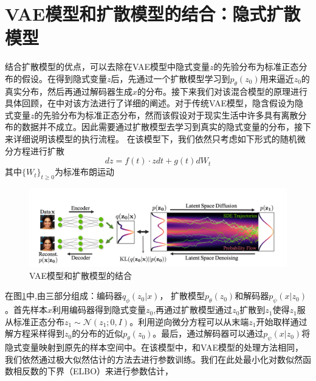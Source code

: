 \section{VAE模型和扩散模型的结合：隐式扩散模型}
结合扩散模型的优点，可以去除在VAE模型中隐式变量$z$的先验分布为标准正态分布的假设。在得到隐式变量$z$后，先通过一个扩散模型学习到$p_{\theta}(z_0)$用来逼近$z_0$的真实分布，然后再通过解码器生成$x$的分布。接下来我们对该混合模型的原理进行具体回顾，在\cite{VAE_diffusion}中对该方法进行了详细的阐述。对于传统VAE模型，隐含假设为隐式变量$z$的先验分布为标准正态分布，然而该假设对于现实生活中许多具有离散分布的数据并不成立。因此需要通过扩散模型去学习到真实的隐式变量的分布，接下来详细说明该模型的执行流程。
在该模型下，我们依然只考虑如下形式的随机微分方程进行扩散
\begin{equation}
    dz = f(t)\cdot zdt + g(t)dW_t
    \label{SDE form }
\end{equation}
其中$\{W_t\}_{t\geq 0}$为标准布朗运动
\begin{figure}[H]
    \centering
    \includegraphics[scale = 0.5]{ThuThesis_ Tsinghua University Thesis LaTeX Template/Picture/VAE_diffusion.png}
    \caption{VAE模型和扩散模型的结合}
    \label{fig_VAE_Diffusion}
\end{figure}
在图\ref{fig_VAE_Diffusion}中,由三部分组成：编码器$q_{\phi}(z_0|x)$， 扩散模型$p_{\theta}(z_0)$和解码器$p_{\psi}(x|z_0)$。首先样本$x$利用编码器得到隐式变量$z_0$,再通过扩散模型通过$z_0$扩散到$z_1$使得$z_1$服从标准正态分布$z_1\sim \mathcal{N}(z_1;0,I)$。利用逆向微分方程可以从末端$z_1$开始取样通过解方程采样得到$z_0$的分布的近似$p_{\theta}(z_0)$。最后，通过解码器可以通过$p_{\psi}(x|z_0)$将隐式变量映射到原先的样本空间中。在该模型中，和VAE模型的处理方法相同，我们依然通过极大似然估计的方法去进行参数训练。我们在此处最小化对数似然函数相反数的下界（ELBO）来进行参数估计，
